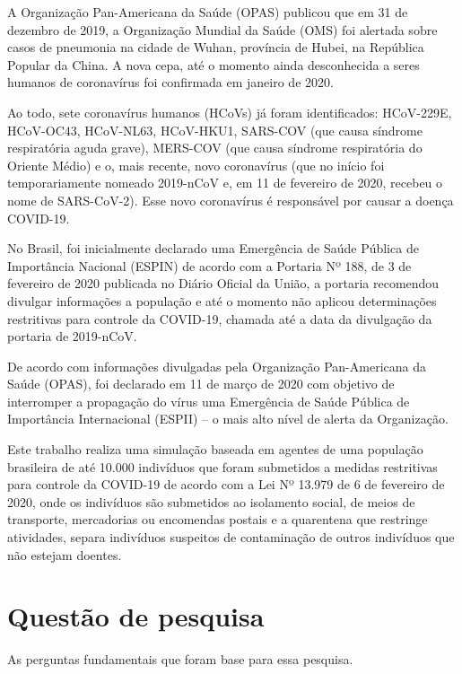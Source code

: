 A Organização Pan-Americana da Saúde (OPAS) publicou que em 31 de dezembro de 2019, a Organização Mundial da Saúde (OMS) foi alertada sobre casos de pneumonia na cidade de Wuhan, província de Hubei, na República Popular da China. A nova cepa, até o momento ainda desconhecida a seres humanos de coronavírus foi confirmada em janeiro de 2020.

Ao todo, sete coronavírus humanos (HCoVs) já foram identificados: HCoV-229E, HCoV-OC43, HCoV-NL63, HCoV-HKU1, SARS-COV (que causa síndrome respiratória aguda grave), MERS-COV (que causa síndrome respiratória do Oriente Médio) e o, mais recente, novo coronavírus (que no início foi temporariamente nomeado 2019-nCoV e, em 11 de fevereiro de 2020, recebeu o nome de SARS-CoV-2). Esse novo coronavírus é responsável por causar a doença COVID-19.

No Brasil, foi inicialmente declarado uma Emergência de Saúde Pública de Importância Nacional (ESPIN) de acordo com a Portaria Nº 188, de 3 de fevereiro de 2020 publicada no Diário Oficial da União, a portaria recomendou divulgar informações a população e até o momento não aplicou determinações restritivas para controle da COVID-19, chamada até a data da divulgação da portaria de  2019-nCoV.

De acordo com informações divulgadas pela Organização Pan-Americana da Saúde (OPAS), foi declarado em 11 de março de 2020 com objetivo de interromper a propagação do vírus uma Emergência de Saúde Pública de Importância Internacional (ESPII) – o mais alto nível de alerta da Organização.  

Este trabalho realiza uma simulação baseada em agentes de uma população brasileira de até 10.000 indivíduos que foram submetidos a medidas restritivas para controle da COVID-19 de acordo com a Lei Nº 13.979 de 6 de fevereiro de 2020, onde os indivíduos são submetidos ao isolamento social, de meios de transporte, mercadorias ou encomendas postais e a quarentena que restringe atividades, separa indivíduos suspeitos de contaminação de outros indivíduos que não estejam doentes.


\section{Questão de pesquisa}%
As perguntas fundamentais que foram base para essa pesquisa.

